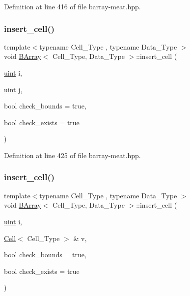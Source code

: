 Definition at line 416 of file barray-\/meat.\+hpp.

\mbox{\label{group__barray-insert_ga4deb6afa6040603fc4fb5a90eef90761}} 
\subsubsection{\texorpdfstring{insert\+\_\+cell()}{insert\_cell()}\hspace{0.1cm}{\footnotesize\ttfamily [3/6]}}
{\footnotesize\ttfamily template$<$typename Cell\+\_\+\+Type , typename Data\+\_\+\+Type $>$ \\
void \hyperlink{class_b_array}{B\+Array}$<$ Cell\+\_\+\+Type, Data\+\_\+\+Type $>$\+::insert\+\_\+cell (\begin{DoxyParamCaption}\item[{\hyperlink{typedefs_8hpp_a91ad9478d81a7aaf2593e8d9c3d06a14}{uint}}]{i,  }\item[{\hyperlink{typedefs_8hpp_a91ad9478d81a7aaf2593e8d9c3d06a14}{uint}}]{j,  }\item[{bool}]{check\+\_\+bounds = {\ttfamily true},  }\item[{bool}]{check\+\_\+exists = {\ttfamily true} }\end{DoxyParamCaption})\hspace{0.3cm}{\ttfamily [inline]}}



Definition at line 425 of file barray-\/meat.\+hpp.

\mbox{\label{group__barray-insert_gac631a7a4b7308b00073a5e521d548933}} 
\subsubsection{\texorpdfstring{insert\+\_\+cell()}{insert\_cell()}\hspace{0.1cm}{\footnotesize\ttfamily [4/6]}}
{\footnotesize\ttfamily template$<$typename Cell\+\_\+\+Type , typename Data\+\_\+\+Type $>$ \\
void \hyperlink{class_b_array}{B\+Array}$<$ Cell\+\_\+\+Type, Data\+\_\+\+Type $>$\+::insert\+\_\+cell (\begin{DoxyParamCaption}\item[{\hyperlink{typedefs_8hpp_a91ad9478d81a7aaf2593e8d9c3d06a14}{uint}}]{i,  }\item[{\hyperlink{class_cell}{Cell}$<$ Cell\+\_\+\+Type $>$ \&}]{v,  }\item[{bool}]{check\+\_\+bounds = {\ttfamily true},  }\item[{bool}]{check\+\_\+exists = {\ttfamily true} }\end{DoxyParamCaption})\hspace{0.3cm}{\ttfamily [inline]}}



